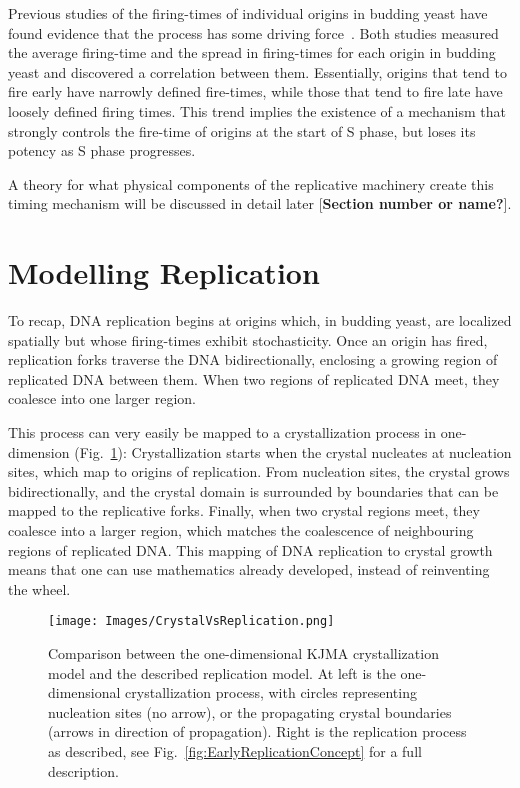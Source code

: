 		Previous studies of the firing-times of individual origins in budding yeast have found evidence that the process has some driving force~\cite{ScottsPaper,StochasticTermination}.
		Both studies measured the average firing-time and the spread in firing-times for each origin in budding yeast and discovered a correlation between them.
		Essentially, origins that tend to fire early have narrowly defined fire-times, while those that tend to fire late have loosely defined firing times.
		This trend implies the existence of a mechanism that strongly controls the fire-time of origins at the start of S phase, but loses its potency as S phase progresses.
		
		A theory for what physical components of the replicative machinery create this timing mechanism will be discussed in detail later [\textbf{Section number or name?}].
		
		
	\section{Modelling Replication}
	\label{sec:Modelling}
	
	To recap, DNA replication begins at origins which, in budding yeast, are localized spatially but whose firing-times exhibit stochasticity.
	Once an origin has fired, replication forks traverse the DNA bidirectionally, enclosing a growing region of replicated DNA between them.
	When two regions of replicated DNA meet, they coalesce into one larger region.
	
	This process can very easily be mapped to a crystallization process in one-dimension (Fig.~\ref{fig:CrystalVsReplication}):
	Crystallization starts when the crystal nucleates at nucleation sites, which map to origins of replication.
	From nucleation sites, the crystal grows bidirectionally, and the crystal domain is surrounded by boundaries that can be mapped to the replicative forks.
	Finally, when two crystal regions meet, they coalesce into a larger region, which matches the coalescence of neighbouring regions of replicated DNA.
	This mapping of DNA replication to crystal growth means that one can use mathematics already developed, instead of reinventing the wheel.
	
	\begin{figure}[tbh]
		\begin{center}
			\texttt{[image: Images/CrystalVsReplication.png]}
		\end{center}
			\caption[Comparing Crystallization with Replication]{\label{fig:CrystalVsReplication} Comparison between the one-dimensional KJMA crystallization model and the described replication model.
				At left is the one-dimensional crystallization process, with circles representing nucleation sites (no arrow), or the propagating crystal boundaries (arrows in direction of propagation).
				Right is the replication process as described, see Fig.~\ref{fig:EarlyReplicationConcept} for a full description.}
	\end{figure}
	
